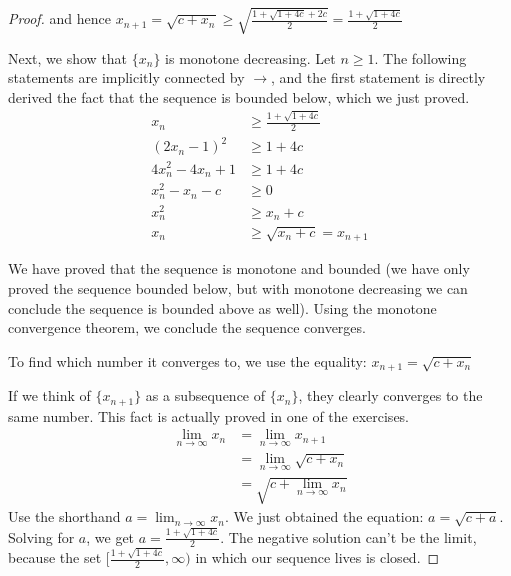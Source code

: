 \documentclass{article}
\begin{document}
\begin{enumerate}
\begin{proof}
    and hence $x_{n+1} =
    \sqrt{c+x_n} \geq \sqrt{\frac{1+\sqrt{1+4c}+2c}{2}} =
    \frac{1+\sqrt{1+4c}}{2}$

    Next, we show that $\{x_n\}$ is monotone decreasing.
    Let $n \geq 1$. The following statements are implicitly connected
    by $\rightarrow$, and the first statement is directly derived the fact that the sequence is bounded below, which
    we just proved.
    \begin{equation} \label{eq2}
      \begin{split}
        x_{n} &\geq \frac{1+\sqrt{1+4c}}{2}\\
        (2x_{n}-1)^2 &\geq 1 + 4c\\
        4x_{n}^2 - 4x_{n} + 1 &\geq 1 + 4c\\
        x_{n}^2-x_{n} -c &\geq 0\\
        x_{n}^2 &\geq x_{n} + c\\
        x_{n} &\geq \sqrt{x_{n} + c} = x_{n+1}
      \end{split}
    \end{equation}

    We have proved that the sequence is monotone and bounded (we have
    only proved the sequence bounded below, but with monotone decreasing
    we can conclude the sequence is bounded above as well). Using the monotone convergence
    theorem, we conclude the sequence converges.

    To find which number it converges to, we use the equality:
    $x_{n+1} = \sqrt{c + x_n}$

    If we think of $\{x_{n+1}\}$ as a subsequence of $\{x_n\}$, they
    clearly converges to the same number. This fact is actually proved
    in one of the exercises.
    \begin{equation*}\label{eq3}
      \begin{split}
        \lim_{n \rightarrow \infty} x_{n} &= \lim_{n \rightarrow \infty}
        x_{n+1}\\
        &= \lim_{n \rightarrow \infty} \sqrt{c +x_n}\\
        &= \sqrt{c + \lim_{n \rightarrow \infty}x_n}
      \end{split}
    \end{equation*}
    Use the shorthand $a=\lim_{n \rightarrow \infty} x_{n}$. We just
    obtained the equation: $a = \sqrt{c + a}$. Solving for $a$, we get
    $a = \frac{1+\sqrt{1+4c}}{2}$. The negative solution can't be the
    limit, because the set $[\frac{1+\sqrt{1+4c}}{2},\infty)$ in which
    our sequence lives is closed.


\end{proof}
\end{enumerate}
\end{document}

